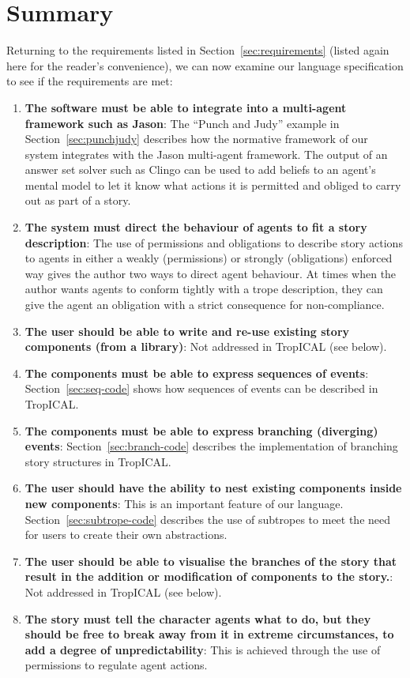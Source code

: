 \documentclass[11pt]{report}
\begin{document}
\section{Summary}
\label{sec:tropical-summary}
Returning to the requirements listed in Section~\ref{sec:requirements} (listed
again here for the reader's convenience), we can now examine our language
specification to see if the requirements are met:

\begin{enumerate}[R1.]
  \item \textbf{The software must be able to integrate into a
    multi-agent framework such as Jason}: The ``Punch and Judy'' example in Section~\ref{sec:punchjudy} describes
  how the normative framework of our system integrates with the Jason
multi-agent framework. The output of an answer set solver such as Clingo can be
used to add beliefs to an agent's mental model to let it know what actions it is
permitted and obliged to carry out as part of a story.
  \item \textbf{The system must direct the behaviour of agents to fit
    a story description}: 
The use of permissions and obligations to describe story actions to agents in
either a weakly (permissions) or strongly (obligations) enforced way gives the
author two ways to direct agent behaviour. At times when the author wants agents
to conform tightly with a trope description, they can give the agent an
obligation with a strict consequence for non-compliance.
  \item \textbf{The user should be able to write and re-use
    existing story components (from a library)}: Not addressed in TropICAL (see below).
  \item \textbf{The components must be able to express sequences of events}: Section~\ref{sec:seq-code} shows how sequences of events can be described in
TropICAL.
  \item \textbf{The components must be able to express branching
    (diverging) events}: Section~\ref{sec:branch-code} describes the
  implementation of branching story structures in TropICAL.
  \item \textbf{The user should have the ability to nest existing
    components inside new components}: This is an important feature of our
  language. Section~\ref{sec:subtrope-code} describes the
use of subtropes to meet the need for users to create their own abstractions.
  \item \textbf{The user should be able to visualise the branches of the
    story that result in the addition or modification of components to the
    story.}: Not addressed in TropICAL (see below).
  \item \textbf{The story must tell the character agents what to do, but
    they should be free to break away from it in extreme circumstances, to add a
    degree of unpredictability}: This is achieved
through the use of permissions to regulate agent actions.
\end{enumerate}
\end{document}
